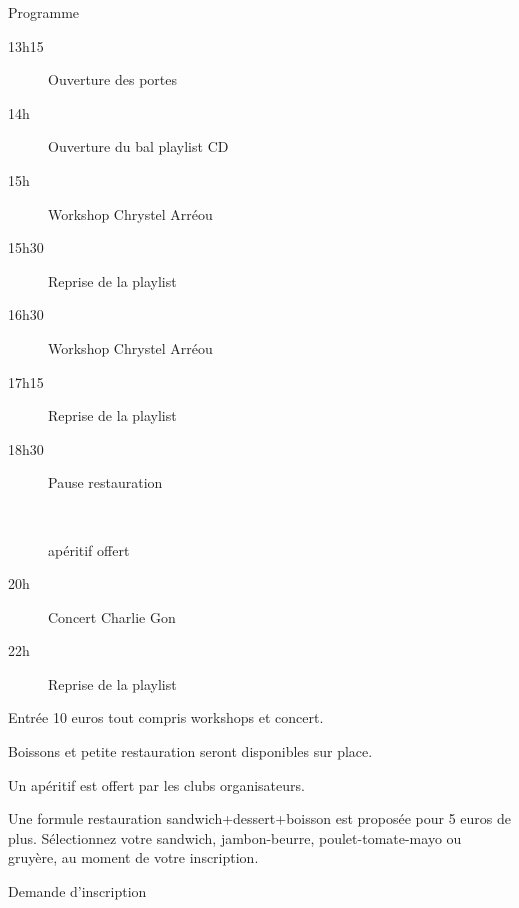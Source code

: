 \documentclass[12pt,a4paper]{article}
\begin{document}
\vfill
\hrulefill
\vfill
\begin{center}
{\Large Programme}\\
\bigskip
\begin{minipage}{0.45\linewidth}
  \begin{description}
\item[13h15] Ouverture des portes
\item[14h~~~] Ouverture du bal playlist CD
\item[15h~~~] Workshop Chrystel Arréou %
\item[15h30] Reprise de la playlist
\item[16h30] Workshop Chrystel Arréou %
\end{description}
\end{minipage}
\hfill
\begin{minipage}{0.45\linewidth}
  \begin{description}
\item[17h15] Reprise de la playlist
\item[18h30] Pause restauration
\item[~~~~~~~~] apéritif offert
\item[20h~~~] Concert Charlie Gon
\item[22h~~~] Reprise de la playlist
\end{description}
\end{minipage}
\end{center}

\vfill
\hrulefill
\vfill

Entrée 10 euros tout compris workshops et concert.

Boissons et petite restauration seront disponibles sur place.

Un apéritif est offert par les clubs organisateurs.

Une formule restauration sandwich+dessert+boisson est proposée pour 5
euros de plus. Sélectionnez votre sandwich, jambon-beurre, poulet-tomate-mayo ou gruyère, au moment de
votre inscription.

\vfill
\hrulefill
\hrulefill
\vfill

\begin{center}
\Large Demande d'inscription
\end{center}
\end{document}
